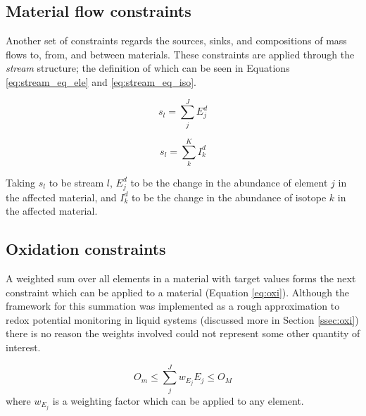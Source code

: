 
\subsection{Material flow constraints} \label{ssec:stream_eq}
Another set of constraints regards the sources, sinks, and compositions of mass
flows to, from, and between materials. These constraints are applied through 
the \textit{stream} structure; the definition of which can be
seen in Equations \ref{eq:stream_eq_ele} and \ref{eq:stream_eq_iso}.

\begin{equation}
\label{eq:stream_eq_ele}
s_{l} = \sum \limits_{j}^{J} E_{j}^{d}
\end{equation}

\begin{equation}
\label{eq:stream_eq_iso}
s_{l} = \sum \limits_{k}^{K} I_{k}^{d}
\end{equation}

Taking $s_{l}$ to be stream $l$, $E_{j}^{d}$ to be the change in the 
abundance of element $j$ in the affected material, and $I_{k}^{d}$ to be 
the change in the abundance of isotope $k$ in the affected
material.

\subsection{Oxidation constraints} \label{ssec:oxid_eq}
A weighted sum over all elements in a material with target values forms the 
next constraint which can be applied to a material (Equation \ref{eq:oxi}). 
Although the framework for this summation was implemented as a rough 
approximation to redox potential
monitoring in liquid systems (discussed more in Section \ref{ssec:oxi}) there is
no reason the weights involved could not represent some other quantity of 
interest. 

\begin{equation}
\label{eq:oxi}
O_{m} \leq \sum \limits_{j}^{J} w_{E_{j}} E_{j} \leq O_{M}
\end{equation}
%
where  $w_{E_{j}}$ is a weighting
factor which can be applied to any element.


